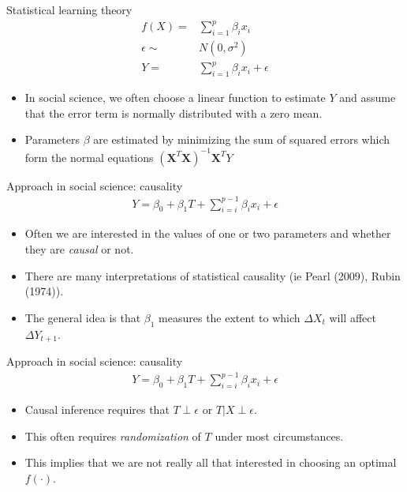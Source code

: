\documentclass{beamer}
\begin{document}
\begin{frame}{Statistical learning theory} %
\begin{align*}
	 f(X) = & \sum_{i=1}^{p} \beta_{i} x_{i} \\
	 \epsilon \sim &  N(0, \sigma^{2}) \\ 
	 Y = & \sum_{i=1}^{p} \beta_{i} x_{i} + \epsilon
\end{align*}

 \begin{itemize}
 	\item In social science, we often choose a linear function to estimate $Y$ and assume that the error term is normally distributed with a zero mean.
 	\item Parameters $\beta$ are estimated by minimizing the sum of squared errors which form the normal equations $(\mathbf{X}^{T}\mathbf{X})^{-1} \mathbf{X}^{T} Y$
 \end{itemize}
\end{frame}


\begin{frame}{Approach in social science: causality} %
\begin{align*}
	 Y = \beta_{0} + \beta_{1} T + \sum_{i = i}^{p-1} \beta_{i} x_{i} + \epsilon
\end{align*}

 \begin{itemize}
 	\item Often we are interested in the values of one or two parameters and whether they are \textit{causal} or not.
 	\item There are many interpretations of statistical causality (ie Pearl (2009), Rubin (1974)). 
 	\item The general idea is that $\beta_{1}$ measures the extent to which $\Delta X_{t}$ will affect $\Delta Y_{t+1}$.
 \end{itemize}
\end{frame}


\begin{frame}{Approach in social science: causality} %
\begin{align*}
	 Y = \beta_{0} + \beta_{1} T + \sum_{i = i}^{p-1} \beta_{i} x_{i} + \epsilon
\end{align*}

 \begin{itemize}
 	\item Causal inference requires that $ T \perp \epsilon$ or $ T| X \perp \epsilon $.
 	\item This often requires \textit{randomization} of $T$ under most circumstances.
 	\item This implies that we are not really all that interested in choosing an optimal $f(\cdot)$.
 \end{itemize}
\end{frame}
\end{document}
